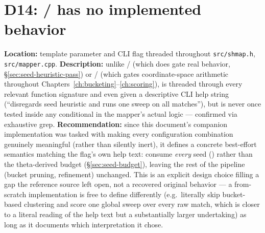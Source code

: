 \section{D14: / has no implemented behavior}
\label{sec:d14}
\textbf{Location:} template parameter and CLI flag threaded throughout \texttt{src/shmap.h},
\texttt{src/mapper.cpp}. \textbf{Description:} unlike / (which
does gate real behavior, \S\ref{sec:seed-heuristic-pass}) or / (which
gates coordinate-space arithmetic throughout Chapters~\ref{ch:bucketing}--\ref{ch:scoring}),
 is threaded through every relevant function signature and even given a
descriptive CLI help string (``disregards seed heuristic and runs one sweep on all matches''), but
is never once tested inside any conditional in the mapper's actual logic --- confirmed via
exhaustive grep. \textbf{Recommendation:} since this document's companion implementation was
tasked with making every configuration combination genuinely meaningful (rather than silently
inert), it defines a concrete best-effort semantics matching the flag's own help text: consume
\emph{every} seed () rather than the theta-derived budget
(\S\ref{sec:seed-budget}), leaving the rest of the pipeline (bucket pruning, refinement)
unchanged. This is an explicit design choice filling a gap the reference source left open, not a
recovered original behavior --- a from-scratch implementation is free to define 
differently (e.g.\ literally skip bucket-based clustering and score one global sweep over every
raw match, which is closer to a literal reading of the help text but a substantially larger
undertaking) as long as it documents which interpretation it chose.

